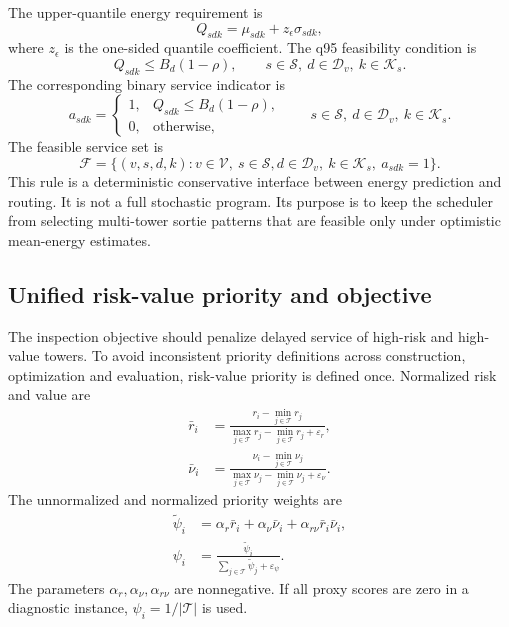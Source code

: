 The upper-quantile energy requirement is
\begin{equation}
Q_{sdk}=\mu_{sdk}+z_{\epsilon}\sigma_{sdk},
\label{eq:q95}
\end{equation}
where \(z_{\epsilon}\) is the one-sided quantile coefficient. The q95 feasibility condition is
\begin{equation}
Q_{sdk}\leq B_d(1-\rho),
\qquad s\in\mathcal{S},\ d\in\mathcal{D}_v,\ k\in\mathcal{K}_s.
\label{eq:chance-constraint}
\end{equation}
The corresponding binary service indicator is
\begin{equation}
a_{sdk}=
\begin{cases}
1, & Q_{sdk}\leq B_d(1-\rho),\\
0, & \mathrm{otherwise},
\end{cases}
\qquad s\in\mathcal{S},\ d\in\mathcal{D}_v,\ k\in\mathcal{K}_s.
\label{eq:sb-service-indicator}
\end{equation}
The feasible service set is
\begin{equation}
\mathcal{F}=\{(v,s,d,k):v\in\mathcal{V},\ s\in\mathcal{S},
d\in\mathcal{D}_v,\ k\in\mathcal{K}_s,\ a_{sdk}=1\}.
\label{eq:feasible-sortie-set}
\end{equation}
This rule is a deterministic conservative interface between energy prediction and routing. It is not a full stochastic program. Its purpose is to keep the scheduler from selecting multi-tower sortie patterns that are feasible only under optimistic mean-energy estimates.

\subsection{Unified risk-value priority and objective}
\label{sec:model-objective}

The inspection objective should penalize delayed service of high-risk and high-value towers. To avoid inconsistent priority definitions across construction, optimization and evaluation, risk-value priority is defined once. Normalized risk and value are
\begin{align}
\bar r_i &=
\frac{r_i-\min_{j\in\mathcal{T}} r_j}
{\max_{j\in\mathcal{T}} r_j-\min_{j\in\mathcal{T}} r_j+\varepsilon_r},
\label{eq:sb-risk-normalization}\\
\bar \nu_i &=
\frac{\nu_i-\min_{j\in\mathcal{T}} \nu_j}
{\max_{j\in\mathcal{T}} \nu_j-\min_{j\in\mathcal{T}} \nu_j+\varepsilon_{\nu}}.
\label{eq:sb-value-normalization}
\end{align}
The unnormalized and normalized priority weights are
\begin{align}
\tilde\psi_i
&=\alpha_r\bar r_i+\alpha_{\nu}\bar \nu_i+\alpha_{r\nu}\bar r_i\bar \nu_i,
\label{eq:sb-priority-raw}\\
\psi_i
&=\frac{\tilde\psi_i}
{\sum_{j\in\mathcal{T}}\tilde\psi_j+\varepsilon_{\psi}}.
\label{eq:risk-value-weight}
\end{align}
The parameters \(\alpha_r,\alpha_{\nu},\alpha_{r\nu}\) are nonnegative. If all proxy scores are zero in a diagnostic instance, \(\psi_i=1/|\mathcal{T}|\) is used.

